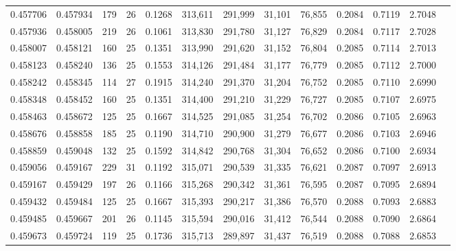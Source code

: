\begin{tabular}{rrrrrrrrrrrrr}
0.457706 & 0.457934 &   179 &  26 &                                     0.1268 & 313,611 & 291,999 &  31,101 &  76,855 & 0.2084 & 0.7119 & 2.7048 \\
0.457936 & 0.458005 &   219 &  26 &                                     0.1061 & 313,830 & 291,780 &  31,127 &  76,829 & 0.2084 & 0.7117 & 2.7028 \\
0.458007 & 0.458121 &   160 &  25 &                                     0.1351 & 313,990 & 291,620 &  31,152 &  76,804 & 0.2085 & 0.7114 & 2.7013 \\
0.458123 & 0.458240 &   136 &  25 &                                     0.1553 & 314,126 & 291,484 &  31,177 &  76,779 & 0.2085 & 0.7112 & 2.7000 \\
0.458242 & 0.458345 &   114 &  27 &                                     0.1915 & 314,240 & 291,370 &  31,204 &  76,752 & 0.2085 & 0.7110 & 2.6990 \\
0.458348 & 0.458452 &   160 &  25 &                                     0.1351 & 314,400 & 291,210 &  31,229 &  76,727 & 0.2085 & 0.7107 & 2.6975 \\
0.458463 & 0.458672 &   125 &  25 &                                     0.1667 & 314,525 & 291,085 &  31,254 &  76,702 & 0.2086 & 0.7105 & 2.6963 \\
0.458676 & 0.458858 &   185 &  25 &                                     0.1190 & 314,710 & 290,900 &  31,279 &  76,677 & 0.2086 & 0.7103 & 2.6946 \\
0.458859 & 0.459048 &   132 &  25 &                                     0.1592 & 314,842 & 290,768 &  31,304 &  76,652 & 0.2086 & 0.7100 & 2.6934 \\
0.459056 & 0.459167 &   229 &  31 &                                     0.1192 & 315,071 & 290,539 &  31,335 &  76,621 & 0.2087 & 0.7097 & 2.6913 \\
0.459167 & 0.459429 &   197 &  26 &                                     0.1166 & 315,268 & 290,342 &  31,361 &  76,595 & 0.2087 & 0.7095 & 2.6894 \\
0.459432 & 0.459484 &   125 &  25 &                                     0.1667 & 315,393 & 290,217 &  31,386 &  76,570 & 0.2088 & 0.7093 & 2.6883 \\
0.459485 & 0.459667 &   201 &  26 &                                     0.1145 & 315,594 & 290,016 &  31,412 &  76,544 & 0.2088 & 0.7090 & 2.6864 \\
0.459673 & 0.459724 &   119 &  25 &                                     0.1736 & 315,713 & 289,897 &  31,437 &  76,519 & 0.2088 & 0.7088 & 2.6853 \\

\end{tabular}
